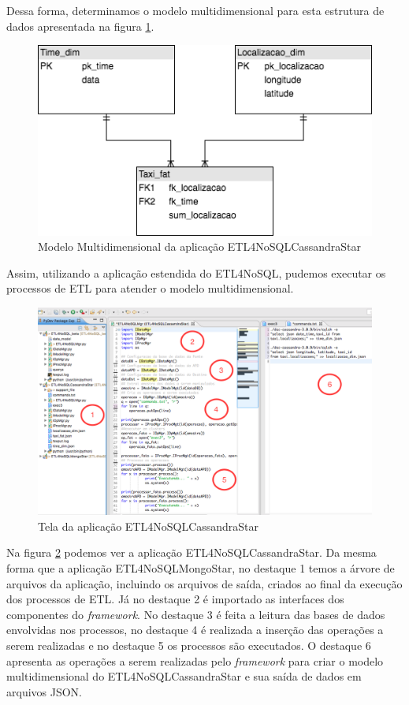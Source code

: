 Dessa forma, determinamos o modelo multidimensional para esta estrutura de dados apresentada na figura \ref{cassandramultidim}.

\begin{figure}[h!]
	\centering
	\includegraphics[scale=0.5]{fig/cassandra_multidim.png}
	\caption{Modelo Multidimensional da aplicação ETL4NoSQLCassandraStar}
	\label{cassandramultidim}
\end{figure}

Assim, utilizando a aplicação estendida do ETL4NoSQL, pudemos executar os processos de ETL para atender o modelo multidimensional.

\begin{figure}[h!]
	\centering
	\includegraphics[scale=0.4]{fig/ETL4NoSQLCassandraStar.png}
	\caption{Tela da aplicação ETL4NoSQLCassandraStar}
	\label{ETL4NoSQLCassandraStar}
\end{figure}

Na figura \ref{ETL4NoSQLCassandraStar} podemos ver a aplicação ETL4NoSQLCassandraStar. Da mesma forma que a aplicação ETL4NoSQLMongoStar, no destaque 1 temos a árvore de arquivos da aplicação, incluindo os arquivos de saída, criados ao final da execução dos processos de ETL. Já no destaque 2 é importado as interfaces dos componentes do \textit{framework}. No destaque 3 é feita a leitura das bases de dados envolvidas nos processos, no destaque 4 é realizada a inserção das operações a serem realizadas e no destaque 5 os processos são executados. O destaque 6 apresenta as operações a serem realizadas pelo \textit{framework} para criar o modelo multidimensional do ETL4NoSQLCassandraStar e sua saída de dados em arquivos JSON.

